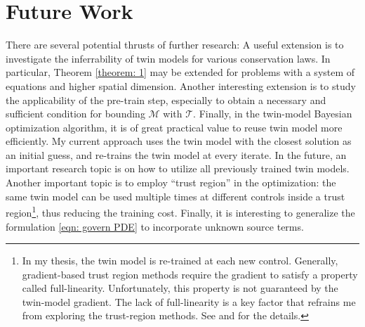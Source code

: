 \section{Future Work}
There are several potential thrusts of further research: 
A useful extension is to investigate the
inferrability of twin models for various conservation laws. In particular,
Theorem \ref{theorem: 1} may be extended for problems with a
system of equations and higher spatial dimension. Another interesting extension
is to study the applicability of the pre-train step, especially to
obtain a necessary and sufficient condition for bounding $\mathcal{M}$
with $\mathcal{T}$. Finally, in the twin-model Bayesian optimization algorithm, 
it is of great practical value to reuse twin model more efficiently.
My current approach uses the twin model with the closest solution as an initial guess,
and re-trains the twin model at every iterate. In the future, an important
research topic is on how to utilize all previously trained twin models. Another important topic 
is to employ ``trust region'' in the optimization: the same twin model can be used multiple times
at different controls inside a trust region\footnote{In my thesis,
the twin model is re-trained at each new control. Generally, gradient-based
trust region methods require the gradient to satisfy a property called full-linearity.
Unfortunately, this property is not guaranteed 
by the twin-model gradient. The lack of full-linearity is a key factor
that refrains me from exploring the trust-region methods. See 
\cite{trustregionconn} and \cite{trustregionwild} for the details.}, thus reducing
the training cost.
Finally, it is interesting to generalize the formulation \eqref{eqn: govern PDE} to
incorporate unknown source terms.\\

